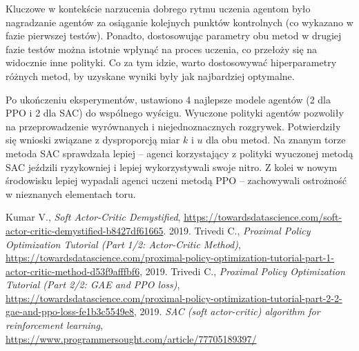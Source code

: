 \documentclass[a4paper,12pt]{article}
\begin{document}
Kluczowe w kontekście narzucenia dobrego rytmu uczenia agentom było nagradzanie agentów za osiąganie kolejnych punktów kontrolnych (co wykazano w fazie pierwszej testów). Ponadto, dostosowując parametry obu metod w drugiej fazie testów można istotnie wpłynąć na proces uczenia, co przełoży się na widocznie inne polityki. Co za tym idzie, warto dostosowywać hiperparametry różnych metod, by uzyskane wyniki były jak najbardziej optymalne.

Po ukończeniu eksperymentów, ustawiono 4 najlepsze modele agentów (2 dla PPO i 2 dla SAC) do wspólnego wyścigu. Wyuczone polityki agentów pozwoliły na przeprowadzenie wyrównanych i niejednoznacznych rozgrywek. Potwierdziły się wnioski związane z dysproporcją miar $k$ i $u$ dla obu metod. Na znanym torze metoda SAC sprawdzała lepiej -- agenci korzystający z polityki wyuczonej metodą SAC jeździli ryzykowniej i lepiej wykorzystywali swoje nitro. Z kolei w nowym środowisku lepiej wypadali agenci uczeni metodą PPO -- zachowywali ostrożność w nieznanych elementach toru.

\begin{thebibliography}{20}
	Kumar V., \textit{Soft Actor-Critic Demystified}, \url{https://towardsdatascience.com/soft-actor-critic-demystified-b8427df61665}. 2019.
	 Trivedi C., \textit{Proximal Policy Optimization Tutorial (Part 1/2: Actor-Critic Method)}, \url{https://towardsdatascience.com/proximal-policy-optimization-tutorial-part-1-actor-critic-method-d53f9afffbf6}, 2019.
	 Trivedi C., \textit{Proximal Policy Optimization Tutorial (Part 2/2: GAE and PPO loss)}, \url{https://towardsdatascience.com/proximal-policy-optimization-tutorial-part-2-2-gae-and-ppo-loss-fe1b3c5549e8}, 2019.
	 \textit{SAC (soft actor-critic) algorithm for reinforcement learning}, \url{https://www.programmersought.com/article/77705189397/}
\end{thebibliography}
\end{document}
